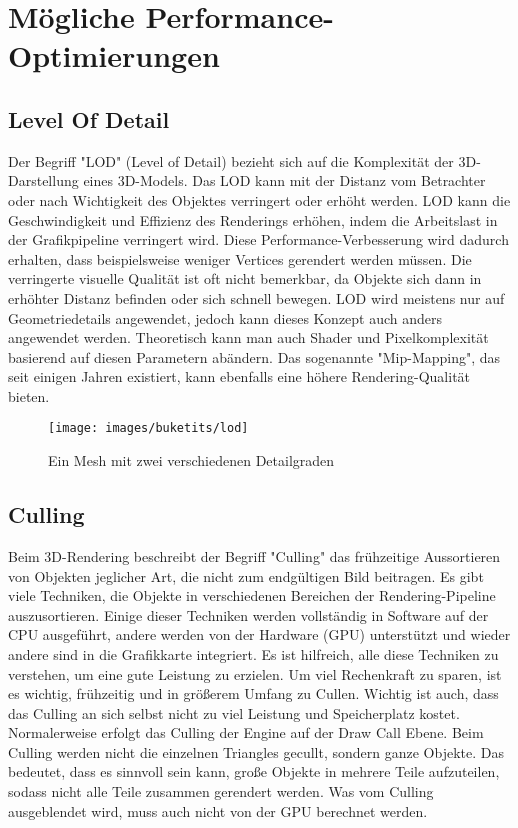 \chapter{Mögliche Performance-Optimierungen} \label{simon_performance}
\section{Level Of Detail}
Der Begriff "LOD" (Level of Detail) bezieht sich auf die Komplexität der 3D-Darstellung eines 3D-Models. Das LOD kann mit der Distanz vom Betrachter oder nach Wichtigkeit des Objektes verringert oder erhöht werden. LOD kann die Geschwindigkeit und Effizienz des Renderings erhöhen, indem die Arbeitslast in der Grafikpipeline verringert wird. Diese Performance-Verbesserung wird dadurch erhalten, dass beispielsweise weniger Vertices gerendert werden müssen. Die verringerte visuelle Qualität ist oft nicht bemerkbar, da Objekte sich dann in erhöhter Distanz befinden oder sich schnell bewegen. LOD wird meistens nur auf Geometriedetails angewendet, jedoch kann dieses Konzept auch anders angewendet werden. Theoretisch kann man auch Shader und Pixelkomplexität basierend auf diesen Parametern abändern. Das sogenannte "Mip-Mapping", das seit einigen Jahren existiert, kann ebenfalls eine höhere Rendering-Qualität bieten.
\cite{_lod_formeshes}

\begin{figure}[H]
	\centering
	\texttt{[image: images/buketits/lod]}
	\caption{Ein Mesh mit zwei verschiedenen Detailgraden\cite{_lod_formeshes}}
\end{figure}


\section{Culling}
Beim 3D-Rendering beschreibt der Begriff "Culling" das frühzeitige Aussortieren von Objekten jeglicher Art, die nicht zum endgültigen Bild beitragen. Es gibt viele Techniken, die Objekte in verschiedenen Bereichen der Rendering-Pipeline auszusortieren. Einige dieser Techniken werden vollständig in Software auf der CPU ausgeführt, andere werden von der Hardware (GPU) unterstützt und wieder andere sind in die Grafikkarte integriert. Es ist hilfreich, alle diese Techniken zu verstehen, um eine gute Leistung zu erzielen. Um viel Rechenkraft zu sparen, ist es wichtig, frühzeitig und in größerem Umfang zu Cullen. Wichtig ist auch, dass das Culling an sich selbst nicht zu viel Leistung und Speicherplatz kostet.
\cite{_cryengine_culling}
Normalerweise erfolgt das Culling der Engine auf der Draw Call Ebene. Beim Culling werden nicht die einzelnen Triangles gecullt, sondern ganze Objekte. Das bedeutet, dass es sinnvoll sein kann, große Objekte in mehrere Teile aufzuteilen, sodass nicht alle Teile zusammen gerendert werden.\cite{_cryengine_culling}
Was vom Culling ausgeblendet wird, muss auch nicht von der GPU berechnet werden.
\cite{_cryengine_culling}


